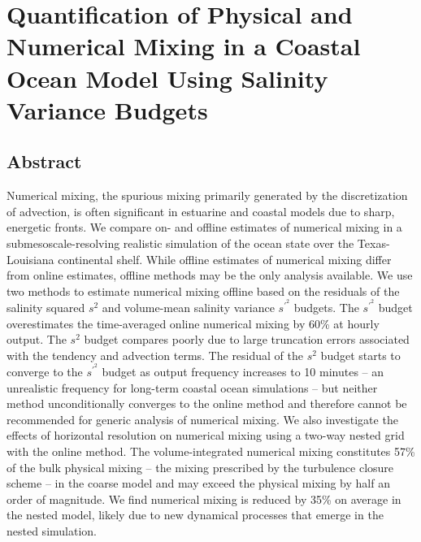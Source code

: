 


\chapter[footnote={This paper is published in the \textit{Journal of Advances in Modeling Earth System}. Reprinted with permission from the American Geophysical Union under the terms of the CC BY license. Full citation:  Schlichting, D., Qu, L., Kobashi, D., \& Hetland, R. (2023). Quantification of physical and numerical mixing in a coastal ocean model using salinity variance budgets. Journal of Advances in Modeling Earth Systems, 15, e2022MS003380. \url{https://doi.org/10.1029/2022MS003380}}]{Quantification of Physical and Numerical Mixing in a Coastal Ocean Model Using Salinity Variance Budgets}

\section{Abstract}
Numerical mixing, the spurious mixing primarily generated by the discretization of advection, is often significant in estuarine and coastal models due to sharp, energetic fronts. We compare on- and offline estimates of numerical mixing in a submesoscale-resolving realistic simulation of the ocean state over the Texas-Louisiana continental shelf. While offline estimates of numerical mixing differ from online estimates, offline methods may be the only analysis available. We use two methods to estimate numerical mixing offline based on the residuals of the salinity squared $s^2$ and volume-mean salinity variance $s^{\prime^2}$ budgets. The $s^{\prime^2}$ budget overestimates the time-averaged online numerical mixing by 60\% at hourly output. The $s^2$ budget compares poorly due to large truncation errors associated with the tendency and advection terms. The residual of the $s^2$ budget starts to converge to the $s^{\prime^2}$ budget as output frequency increases to 10 minutes -- an unrealistic frequency for long-term coastal ocean simulations -- but neither method unconditionally converges to the online method and therefore cannot be recommended for generic analysis of numerical mixing. We also investigate the effects of horizontal resolution on numerical mixing using a two-way nested grid with the online method. The volume-integrated numerical mixing constitutes 57\% of the bulk physical mixing -- the mixing prescribed by the turbulence closure scheme -- in the coarse model and may exceed the physical mixing by half an order of magnitude. We find numerical mixing is reduced by 35\% on average in the nested model, likely due to new dynamical processes that emerge in the nested simulation.

